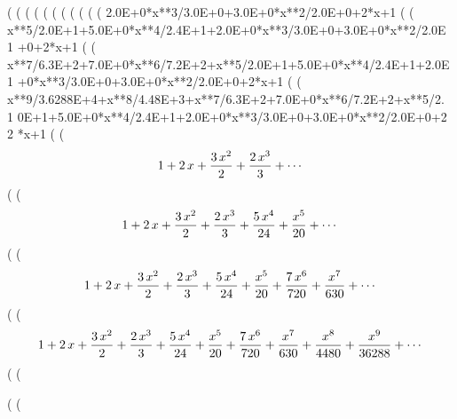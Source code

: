 (%
(%
(%
(%
(%
(%
(%
(%
(%
(%
(%
      2.0E+0*x**3/3.0E+0+3.0E+0*x**2/2.0E+0+2*x+1
(%
(%
      x**5/2.0E+1+5.0E+0*x**4/2.4E+1+2.0E+0*x**3/3.0E+0+3.0E+0*x**2/2.0E
     1   +0+2*x+1
(%
(%
      x**7/6.3E+2+7.0E+0*x**6/7.2E+2+x**5/2.0E+1+5.0E+0*x**4/2.4E+1+2.0E
     1   +0*x**3/3.0E+0+3.0E+0*x**2/2.0E+0+2*x+1
(%
(%
      x**9/3.6288E+4+x**8/4.48E+3+x**7/6.3E+2+7.0E+0*x**6/7.2E+2+x**5/2.
     1   0E+1+5.0E+0*x**4/2.4E+1+2.0E+0*x**3/3.0E+0+3.0E+0*x**2/2.0E+0+2
     2   *x+1
(%
(%
$$1+2\,x+{{3\,x^2}\over{2}}+{{2\,x^3}\over{3}}+\cdots $$
(%
(%
$$1+2\,x+{{3\,x^2}\over{2}}+{{2\,x^3}\over{3}}+{{5\,x^4}\over{24}}+{{
 x^5}\over{20}}+\cdots $$
(%
(%
$$1+2\,x+{{3\,x^2}\over{2}}+{{2\,x^3}\over{3}}+{{5\,x^4}\over{24}}+{{
 x^5}\over{20}}+{{7\,x^6}\over{720}}+{{x^7}\over{630}}+\cdots $$
(%
(%
$$1+2\,x+{{3\,x^2}\over{2}}+{{2\,x^3}\over{3}}+{{5\,x^4}\over{24}}+{{
 x^5}\over{20}}+{{7\,x^6}\over{720}}+{{x^7}\over{630}}+{{x^8}\over{
 4480}}+{{x^9}\over{36288}}+\cdots $$
(%
(%

(%
(%
